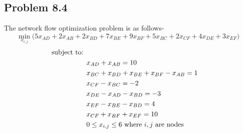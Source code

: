 \documentclass[letterpaper,12pt]{article}
\theoremstyle{definition}
\begin{document}
\subsection*{Problem 8.4 }
The network flow optimization problem is as follows-
\begin{equation*}
\min_{x_{i,j}}  \bigl( 5x_{AD} + 2x_{AB} + 2x_{BD} + 7x_{BE} + 9x_{BF} + 5x_{BC} + 2x_{CF} + 4x_{DE}+ 3x_{EF}\bigl)
 \end{equation*}
\begin{align*}
  \textnormal{subject to: }\\
  &x_{AD} + x_{AB} = 10\\
  &x_{BC} + x_{BD} + x_{BE} + x_{BF} - x_{AB} = 1\\
  &x_{CF} - x_{BC} = -2\\
  &x_{DE} - x_{AD} - x_{BD} = -3\\
  &x_{EF} - x_{BE} - x_{BD} = 4 \\
  &x_{CF} + x_{BF} + x_{EF} = 10\\
  & 0 \le x_{i,j} \le 6 \textnormal{ where $i,j$ are nodes}
\end{align*}
\end{document}
